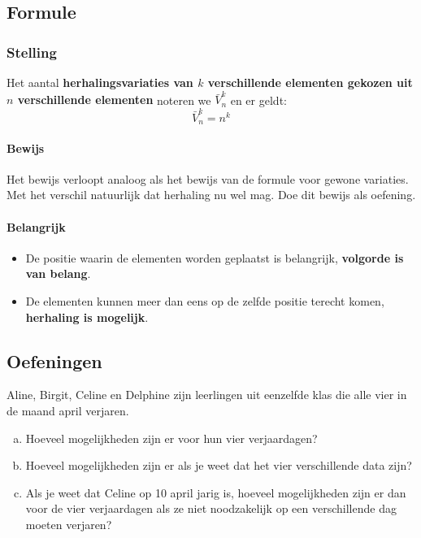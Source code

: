 \documentclass[12pt,a4paper,twoside]{article}
\begin{document}
\subsection{Formule}

\subsubsection*{Stelling}
\begin{mdframed}
Het aantal {\bf herhalingsvariaties van $k$ verschillende elementen gekozen uit $n$ verschillende elementen} noteren we $\bar{V}^k_n$ en er geldt:
$$\bar{V}^k_n=n^k$$
\end{mdframed}

\paragraph*{Bewijs} Het bewijs verloopt analoog als het bewijs van de formule voor gewone variaties. Met het verschil natuurlijk dat herhaling nu wel mag. Doe dit bewijs als oefening.

\paragraph*{Belangrijk}
\begin{itemize}
  \item De positie waarin de elementen worden geplaatst is belangrijk, {\bf volgorde is van belang}.
  \item De elementen kunnen meer dan eens op de zelfde positie terecht komen, {\bf herhaling is mogelijk}.
\end{itemize}

\subsection{Oefeningen}

\begin{oefening}
Aline, Birgit, Celine en Delphine zijn leerlingen uit eenzelfde klas die alle vier in de maand april verjaren.
\begin{enumerate}[(a)]
  \item Hoeveel mogelijkheden zijn er voor hun vier verjaardagen?
  \item Hoeveel mogelijkheden zijn er als je weet dat het vier verschillende data zijn?
  \item Als je weet dat Celine op 10 april jarig is, hoeveel mogelijkheden zijn er dan voor de vier verjaardagen als ze niet noodzakelijk op een verschillende dag moeten verjaren?
\end{enumerate}
\end{oefening}
\end{document}
